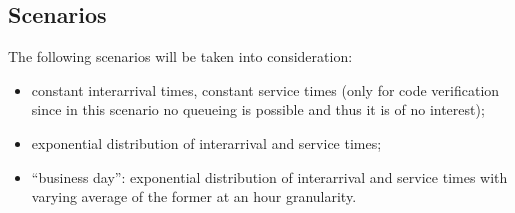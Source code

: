 \subsection{Scenarios}
The following scenarios will be taken into consideration:
\begin{itemize}
    \item constant interarrival times, constant service times (only for code verification since in this scenario no queueing is possible and thus it is of no interest);
    \item exponential distribution of interarrival and service times;
    \item ``business day'': exponential distribution of interarrival and service times with varying average of the former at an hour granularity.
\end{itemize}
